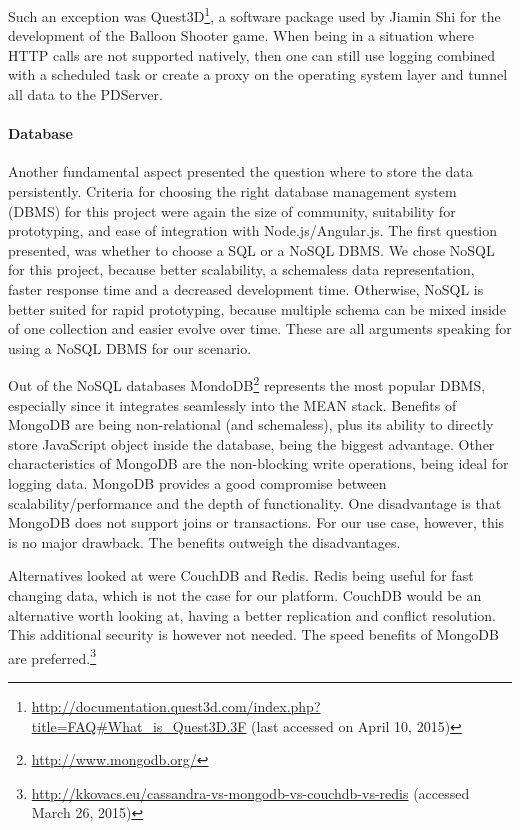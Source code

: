 		Such an exception was Quest3D\footnote{\url{http://documentation.quest3d.com/index.php?title=FAQ\#What_is_Quest3D.3F} (last accessed on April 10, 2015)}, a software package used by Jiamin Shi for the development of the Balloon Shooter game. When being in a situation where HTTP calls are not supported natively, then one can still use logging combined with a scheduled task or create a proxy on the operating system layer and tunnel all data to the PDServer.





	\paragraph{Database}

		Another fundamental aspect presented the question where to store the data persistently. Criteria for choosing the right database management system (DBMS) for this project were again the size of community, suitability for prototyping, and ease of integration with Node.js/Angular.js. The first question presented, was whether to choose a SQL or a NoSQL DBMS. We chose NoSQL for this project, because better scalability, a schemaless data representation, faster response time and a decreased development time\cite{vaish2013getting}. Otherwise, NoSQL is better suited for rapid prototyping, because multiple schema can be mixed inside of one collection and easier evolve over time. These are all arguments speaking for using a NoSQL DBMS for our scenario. 

		Out of the NoSQL databases MondoDB\footnote{\url{http://www.mongodb.org/}} represents the most popular DBMS, especially since it integrates seamlessly into the MEAN stack. Benefits of MongoDB are being non-relational (and schemaless), plus its ability to directly store JavaScript object inside the database, being the biggest advantage. Other characteristics of MongoDB are the non-blocking write operations, being ideal for logging data. MongoDB provides a good compromise between scalability/performance and the depth of functionality. One disadvantage is that MongoDB does not support joins or transactions. For our use case, however, this is no major drawback. The benefits outweigh the disadvantages. 

		Alternatives looked at were CouchDB and Redis. Redis being useful for fast changing data, which is not the case for our platform. CouchDB would be an alternative worth looking at, having a better replication and conflict resolution. This additional security is however not needed. The speed benefits of MongoDB are preferred.\footnote{\url{http://kkovacs.eu/cassandra-vs-mongodb-vs-couchdb-vs-redis} (accessed March 26, 2015)}


